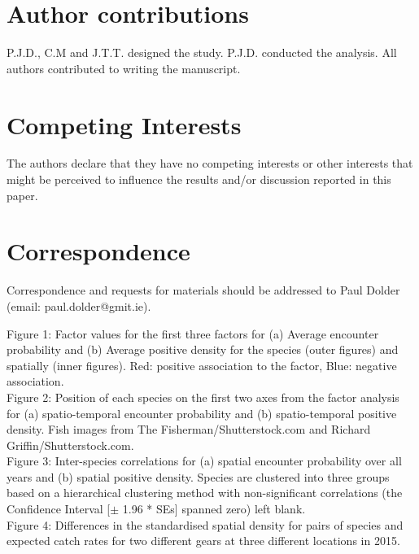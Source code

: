 \documentclass[fleqn,10pt]{wlscirep}
\begin{document}
\section*{Author contributions}
P.J.D., C.M and J.T.T. designed the study. P.J.D.  conducted the analysis. All
authors contributed to writing the manuscript.  


\section*{Competing Interests}
The authors declare that they have no competing interests or other interests
that might be perceived to influence the results and/or discussion reported in
this paper.

\section*{Correspondence}
Correspondence and requests for materials should be addressed to Paul Dolder
(email: paul.dolder@gmit.ie).



\newpage

Figure 1: Factor values for the first three factors for (a) Average encounter
probability and (b) Average positive density for the species (outer figures)
and spatially (inner figures).  Red: positive association to the factor, Blue:
negative association.\\ 


Figure 2: Position of each species on the first two axes from the factor
analysis for (a) spatio-temporal encounter probability and (b) spatio-temporal
positive density. Fish images from The Fisherman/Shutterstock.com and Richard
Griffin/Shutterstock.com.\\
	
Figure 3: Inter-species correlations for (a) spatial encounter probability over
all years and (b) spatial positive density.  Species are clustered into three
groups based on a hierarchical clustering method with non-significant
correlations (the Confidence Interval [$\pm$ 1.96 * SEs] spanned zero) left
blank.\\

Figure 4: Differences in the standardised spatial density for pairs of species
and expected catch rates for two different gears at three different locations
in 2015.\\
\end{document}
